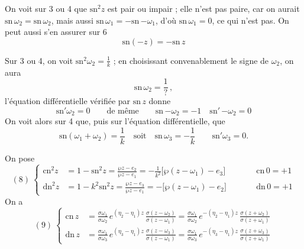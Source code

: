 \documentclass[11pt,a4paper]{article}
\begin{document}
On voit sur 3 ou 4 que $\mathrm{sn}^2 z$ est pair ou impair ; elle n'est pas
paire, car on aurait $\mathrm{sn}\,\omega_2 = \mathrm{sn}\,\omega_2$,
mais aussi $\mathrm{sn}\,\omega_1 = -\mathrm{sn}\,{-\omega_1}$, d'où
$\mathrm{sn}\,\omega_1 = 0$, ce qui n'est pas. On peut aussi s'en assurer sur 6
\[
\boxed{\ \mathrm{sn}(-z) = -\mathrm{sn}\,z\ }
\]

Sur 3 ou 4, on voit $\mathrm{sn}^2\omega_2 = \frac{1}{k}$ ; en choisissant convenablement le signe de $\omega_2$,
on aura
\[
\mathrm{sn}\,\omega_2 = \frac{1}{?}\,,
\]
l'équation différentielle vérifiée par $\mathrm{sn}\,z$ donne
\[
\mathrm{sn}'\omega_2 = 0 \qquad \text{de même} \qquad \mathrm{sn}\,{-\omega_2} = -1
\quad \mathrm{sn}'\,{-\omega_2} = 0
\]
On voit alors sur 4 que\struck{\ill{}}, puis sur l'équation différentielle, que
\[
\mathrm{sn}(\omega_1+\omega_2) = \frac{1}{k} \quad \text{soit} \quad
\mathrm{sn}\,\omega_3 = -\frac{1}{k} \qquad \mathrm{sn}'\omega_3 = 0 .
\]

On pose
\[
(8)\ \left\lbrace
\begin{aligned}
\mathrm{cn}^2 z &= 1 - \mathrm{sn}^2 z = \frac{\wp z - e_2}{\wp z - e_1}
= -\frac{1}{k^2}\bigl[\wp(z-\omega_1) - e_3\bigr]
&\qquad& \boxed{\mathrm{cn}\,0 = +1}\\
\mathrm{dn}^2 z &= 1 - k^2\mathrm{sn}^2 z = \frac{\wp z - e_3}{\wp z - e_1}
= -\bigl[\wp(z-\omega_1) - e_2\bigr]
&& \boxed{\mathrm{dn}\,0 = +1}
\end{aligned}
\right.
\]
On a
\[
(9)\ \left\lbrace
\begin{aligned}
\mathrm{cn}\,z &= \frac{\sigma\omega_1}{\sigma\omega_2}\,e^{(\eta_2-\eta_1)z}\,
\frac{\sigma(z-\omega_2)}{\sigma(z-\omega_1)}
= \frac{\sigma\omega_1}{\sigma\omega_2}\,e^{-(\eta_2-\eta_1)z}\,
\frac{\sigma(z+\omega_2)}{\sigma(z+\omega_1)}\\
\mathrm{dn}\,z &= \frac{\sigma\omega_1}{\sigma\omega_3}\,e^{(\eta_3-\eta_1)z}\,
\frac{\sigma(z-\omega_3)}{\sigma(z-\omega_1)}
= \frac{\sigma\omega_1}{\sigma\omega_3}\,e^{-(\eta_3-\eta_1)z}\,
\frac{\sigma(z+\omega_3)}{\sigma(z+\omega_1)}
\end{aligned}
\right.
\]
\end{document}
